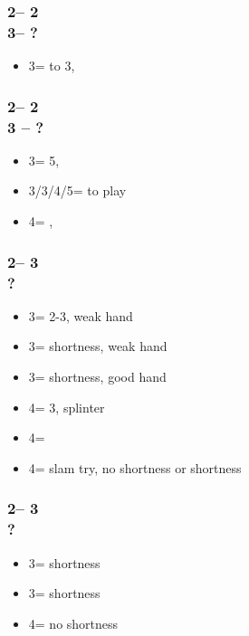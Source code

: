 \subsubsection*{2\spades -- 2\nt\\
                3\clubs -- ?}
\begin{itemize}
    \item 3\diams = \inv to 3\nt, \nat
\end{itemize}

\subsubsection*{2\spades -- 2\nt\\
                3 -- ?}
\begin{itemize}
    \item 3\hearts = 5\hearts, \fton{3\spades}
    \item 3\spades/3\nt/4\spades/5\minor = to play
    \item 4\nt = \inv, \nat
\end{itemize}

\subsubsection*{2\spades -- 3\diams\\
                ?}
\begin{itemize}
    \item 3\hearts = 2-3\hearts, weak hand
    \item 3\spades = \hearts shortness, weak hand
    \item 3\nt = \hearts shortness, good hand
    \item 4\clubs = 3\hearts, splinter
    \item 4\diams = \hearts
    \item 4\hearts = slam try, no shortness or \diams shortness
\end{itemize}

\subsubsection*{2\spades -- 3\hearts\\
                ?}
\begin{itemize}
    \item 3\spades = \clubs shortness
    \item 3\nt = \diams shortness
    \item 4\clubs = no \minor shortness
\end{itemize}

